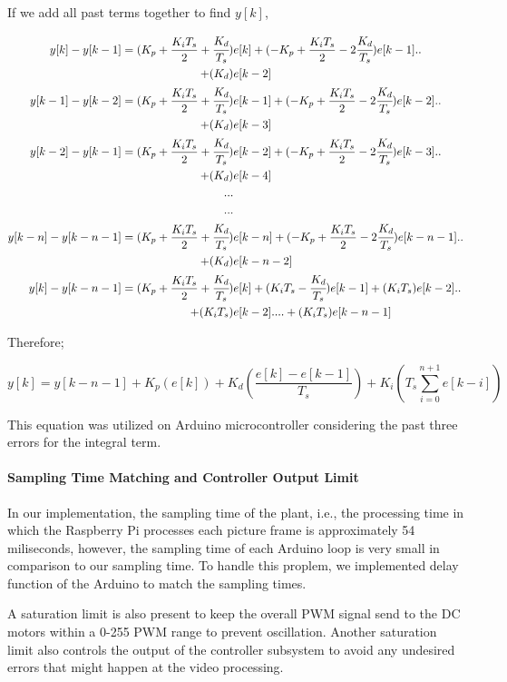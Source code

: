 \documentclass[a4paper,12pt]{article}
\begin{document}
\begin{enumerate}
	If we add all past terms together to find $y[k]$,
	
	\begin{align*}
	y[k]-y[k-1] = (K_p+\frac{K_i T_s}{2}+\cfrac{K_d}{T_s})&e[k]+(-K_p+\frac{K_i T_s}{2}-2 \cfrac{K_d}{T_s})e[k-1]..\\
	+(K_d)&e[k-2]\\
	y[k-1]-y[k-2] = (K_p+\frac{K_i T_s}{2}+\cfrac{K_d}{T_s})&e[k-1]+(-K_p+\frac{K_i T_s}{2}-2 \cfrac{K_d}{T_s})e[k-2]..\\
	+(K_d)&e[k-3] \\
	y[k-2]-y[k-1] = (K_p+\frac{K_i T_s}{2}+\cfrac{K_d}{T_s})&e[k-2]+(-K_p+\frac{K_i T_s}{2}-2 \cfrac{K_d}{T_s})e[k-3]..\\
	+(K_d)&e[k-4]\\
	...\\
	...\\
	y[k-n]-y[k-n-1] = (K_p+\frac{K_i T_s}{2}+\cfrac{K_d}{T_s})&e[k-n]+(-K_p+\frac{K_i T_s}{2}-2 \cfrac{K_d}{T_s})e[k-n-1]..\\
	+(K_d)&e[k-n-2]\\
	y[k]-y[k-n-1]= (K_p+\frac{K_i T_s}{2}+\cfrac{K_d}{T_s})&e[k] + (K_i T_s-\cfrac{K_d}{T_s})e[k-1] + (K_i T_s)e[k-2] ..\\ 
	+ (K_i T_s)&e[k-2]  .... +  (K_i T_s)e[k-n-1]
	\end{align*}
	
	Therefore;
	
	$$ 	\boxed{ y[k] = y[k-n-1]  + K_p (e[k] ) + K_d ( \frac{e[k]-e[k-1] }{T_s} )  + K_i (T_s  	 \sum_{i=0}^{n+1} e[k-i])  } $$
	
	This equation was utilized on Arduino microcontroller considering the past three errors for the integral term.
	
	
	
	\paragraph*{Sampling Time Matching and Controller Output Limit}
	
	In our implementation, the sampling time of the plant, i.e., the processing time in which the Raspberry Pi processes each picture frame is approximately 54 miliseconds, however, the sampling time of each Arduino loop is very small in comparison to our sampling time. To handle this proplem, we implemented delay function of the Arduino to match the sampling times.
	
	A saturation limit is also present to keep the overall PWM signal send to the DC motors within a 0-255 PWM range to prevent oscillation. Another saturation limit also controls the output of the controller subsystem to avoid any undesired errors that might happen at the video processing.
	

\end{enumerate}
\end{document}
